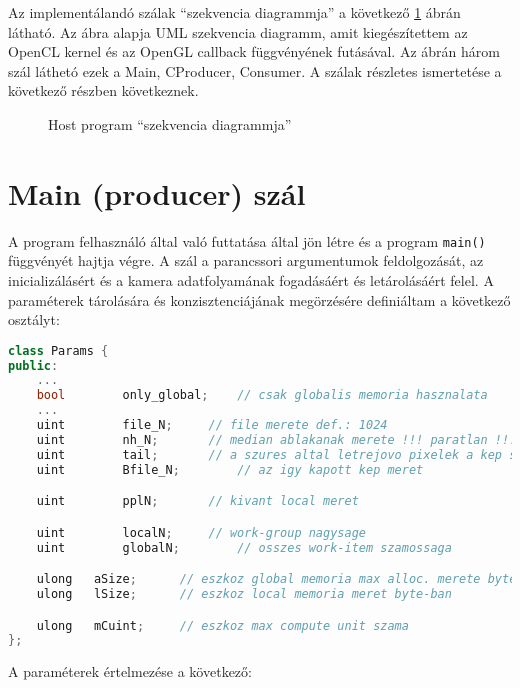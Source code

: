 	Az implementálandó szálak ``szekvencia diagrammja'' a következő \ref{fig:host_seq} ábrán látható.
	Az ábra alapja UML szekvencia diagramm, amit kiegészítettem az OpenCL kernel
	és az OpenGL callback függvényének futásával. Az ábrán három szál láthetó ezek a Main, CProducer, Consumer.
	A szálak részletes ismertetése a következő részben következnek.
	\newpage
	 
\begin{figure}[H]
\resizebox{\linewidth}{!}{}
	\caption{Host program ``szekvencia diagrammja''}
	\label{fig:host_seq}
\end{figure}

	
\section{Main (producer) szál}
	A program felhasználó által való futtatása által jön létre és a program \texttt{main()} függvényét hajtja végre. A szál a
	parancssori argumentumok feldolgozását, az inicializálásért és a kamera adatfolyamának fogadásáért és letárolásáért felel.
	A paraméterek tárolására és konzisztenciájának megörzésére definiáltam a következő osztályt:
\begin{lstlisting}[language=C++]	
class Params {
public:
	...
	bool		only_global;	// csak globalis memoria hasznalata
	...
	uint		file_N;		// file merete def.: 1024
	uint		nh_N;		// median ablakanak merete !!! paratlan !!!
	uint		tail;		// a szures altal letrejovo pixelek a kep szelen 
	uint		Bfile_N;		// az igy kapott kep meret

	uint		pplN;		// kivant local meret

	uint		localN;		// work-group nagysage
	uint		globalN;		// osszes work-item szamossaga

	ulong	aSize;		// eszkoz global memoria max alloc. merete byte-ban
	ulong	lSize;		// eszkoz local memoria meret byte-ban

	ulong	mCuint;		// eszkoz max compute unit szama
};
\end{lstlisting}
	A paraméterek értelmezése a következő:
